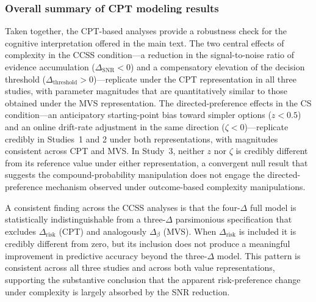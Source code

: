 \documentclass[man,floatsintext]{apa7}
\begin{document}
\FloatBarrier


\subsubsection{Overall summary of CPT modeling results}

Taken together, the CPT-based analyses provide a robustness check for the cognitive interpretation offered in the main text. The two central effects of complexity in the CCSS condition---a reduction in the signal-to-noise ratio of evidence accumulation ($\Delta_{\text{SNR}} < 0$) and a compensatory elevation of the decision threshold ($\Delta_{\text{threshold}} > 0$)---replicate under the CPT representation in all three studies, with parameter magnitudes that are quantitatively similar to those obtained under the MVS representation. The directed-preference effects in the CS condition---an anticipatory starting-point bias toward simpler options ($z < 0.5$) and an online drift-rate adjustment in the same direction ($\zeta < 0$)---replicate credibly in Studies~1 and 2 under both representations, with magnitudes consistent across CPT and MVS. In Study~3, neither $z$ nor $\zeta$ is credibly different from its reference value under either representation, a convergent null result that suggests the compound-probability manipulation does not engage the directed-preference mechanism observed under outcome-based complexity manipulations.

A consistent finding across the CCSS analyses is that the four-$\Delta$ full model is statistically indistinguishable from a three-$\Delta$ parsimonious specification that excludes $\Delta_{\text{risk}}$ (CPT) and analogously $\Delta_\beta$ (MVS). When $\Delta_{\text{risk}}$ is included it is credibly different from zero, but its inclusion does not produce a meaningful improvement in predictive accuracy beyond the three-$\Delta$ model. This pattern is consistent across all three studies and across both value representations, supporting the substantive conclusion that the apparent risk-preference change under complexity is largely absorbed by the SNR reduction.
\end{document}
